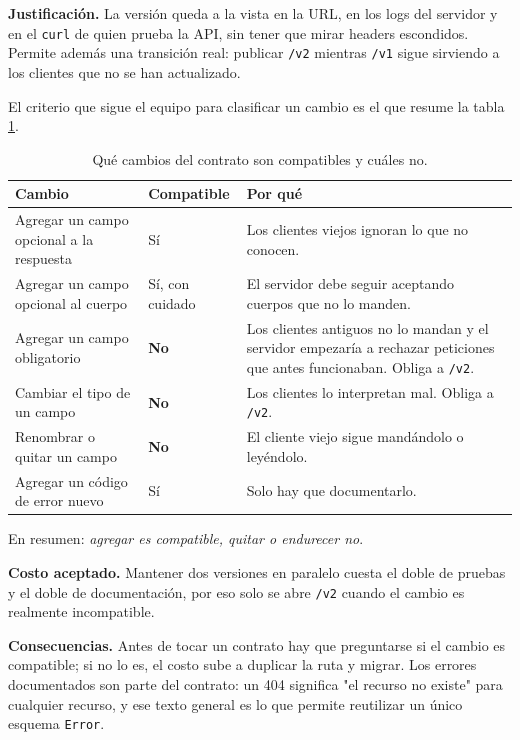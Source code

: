 \documentclass[12pt, a4paper]{article}
\begin{document}
\textbf{Justificación.} La versión queda a la vista en la URL, en los logs
del servidor y en el \texttt{curl} de quien prueba la API, sin tener que
mirar headers escondidos. Permite además una transición real: publicar
\texttt{/v2} mientras \texttt{/v1} sigue sirviendo a los clientes que no
se han actualizado.

El criterio que sigue el equipo para clasificar un cambio es el que
resume la tabla \ref{tab:compat}.

\begin{table}[H]
\centering
\caption{Qué cambios del contrato son compatibles y cuáles no.}
\label{tab:compat}
\begin{tabular}{@{}p{8.0cm}p{2.2cm}p{2.9cm}@{}}
\toprule
\textbf{Cambio} & \textbf{Compatible} & \textbf{Por qué} \\
\midrule
Agregar un campo opcional a la respuesta & Sí &
Los clientes viejos ignoran lo que no conocen. \\
\addlinespace
Agregar un campo opcional al cuerpo & Sí, con cuidado &
El servidor debe seguir aceptando cuerpos que no lo manden. \\
\addlinespace
Agregar un campo obligatorio & \textbf{No} &
Los clientes antiguos no lo mandan y el servidor empezaría a rechazar
peticiones que antes funcionaban. Obliga a \texttt{/v2}. \\
\addlinespace
Cambiar el tipo de un campo & \textbf{No} &
Los clientes lo interpretan mal. Obliga a \texttt{/v2}. \\
\addlinespace
Renombrar o quitar un campo & \textbf{No} &
El cliente viejo sigue mandándolo o leyéndolo. \\
\addlinespace
Agregar un código de error nuevo & Sí &
Solo hay que documentarlo. \\
\bottomrule
\end{tabular}
\end{table}

En resumen: \emph{agregar es compatible, quitar o endurecer no}.

\textbf{Costo aceptado.} Mantener dos versiones en paralelo cuesta el doble
de pruebas y el doble de documentación, por eso solo se abre \texttt{/v2}
cuando el cambio es realmente incompatible.

\textbf{Consecuencias.} Antes de tocar un contrato hay que preguntarse si
el cambio es compatible; si no lo es, el costo sube a duplicar la ruta y
migrar. Los errores documentados son parte del contrato: un 404 significa
"el recurso no existe" para cualquier recurso, y ese texto general es lo
que permite reutilizar un único esquema \texttt{Error}.
\end{document}
